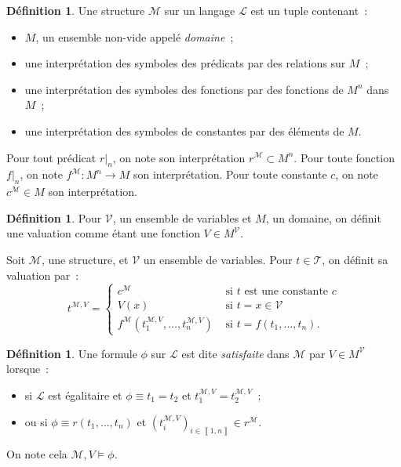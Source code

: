 \documentclass{article}
\theoremstyle{definition}
\newtheorem{déf}[thm]{Définition}
\theoremstyle{remark}
\newcommand{\intint}[2]{\left\llbracket#1, #2\right\rrbracket}
\begin{document}
	\begin{déf} Une structure $\mathcal M$ sur un langage $\mathcal L$ est un tuple contenant~:
	\begin{itemize}
		\item $M$, un ensemble non-vide appelé \textit{domaine}~;
		\item une interprétation des symboles des prédicats par des relations sur $M$~;
		\item une interprétation des symboles des fonctions par des fonctions de $M^n$ dans $M$~;
		\item une interprétation des symboles de constantes par des éléments de $M$.
	\end{itemize}

	Pour tout prédicat $r|_n$, on note son interprétation $r^{\mathcal M} \subset M^n$. Pour toute fonction $f|_n$, on note $f^{\mathcal M} : M^n \to M$
	son interprétation. Pour toute constante $c$, on note $c^{\mathcal M} \in M$ son interprétation.
	\end{déf}

	\begin{déf} Pour $\mathcal V$, un ensemble de variables et $M$, un domaine, on définit une valuation comme étant une fonction $V \in M^{\mathcal V}$.

	Soit $\mathcal M$, une structure, et $\mathcal V$ un ensemble de variables. Pour $t \in \mathcal T$, on définit sa valuation par~:
	\[t^{\mathcal M,V} = \begin{cases}
		c^{\mathcal M} &\text{ si $t$ est une constante $c$} \\
		V(x) &\text{ si } t=x \in \mathcal V\\
		f^{\mathcal M}(t_1^{\mathcal M,V}, \ldots, t_n^{\mathcal M,V}) &\text{ si } t = f(t_1, \ldots, t_n).
		\end{cases}\]
	\end{déf}

	\begin{déf} Une formule $\phi$ sur $\mathcal L$ est dite \textit{satisfaite} dans $\mathcal M$ par $V \in M^{\mathcal V}$ lorsque~:
	\begin{itemize}
		\item si $\mathcal L$ est égalitaire et $\phi \equiv t_1 = t_2$ et $t_1^{\mathcal M,V}=t_2^{\mathcal M,V}$~;
		\item ou si $\phi \equiv r(t_1, \ldots, t_n)$ et $(t_i^{\mathcal M,V})_{i \in \intint 1n} \in r^{\mathcal M}$.
	\end{itemize}
	On note cela $\mathcal M,V \models \phi$.
	\end{déf}
\end{document}
